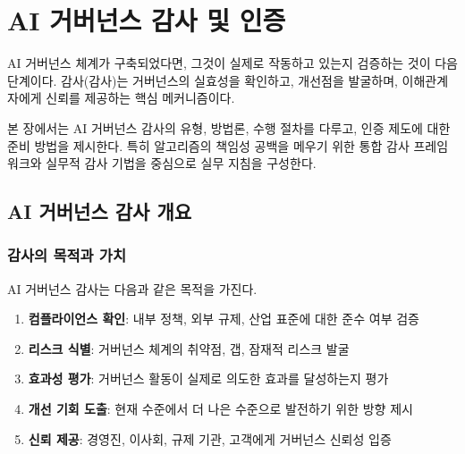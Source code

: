 
\chapter{AI 거버넌스 감사 및 인증}
\label{ch:audit_certification}

AI 거버넌스 체계가 구축되었다면, 
그것이 실제로 작동하고 있는지 검증하는 것이 다음 단계이다. 
감사(감사)는 거버넌스의 실효성을 확인하고, 
개선점을 발굴하며, 이해관계자에게 신뢰를 제공\cite{toreini2020relationship}하는 핵심 메커니즘이다.

본 장에서는 AI 거버넌스 감사의 유형, 방법론, 수행 절차를 다루고, 인증 제도에 대한 준비 방법\cite{zabala2024state}을 제시한다. 특히 알고리즘의 책임성 공백을 메우기 위한 통합 감사 프레임워크\cite{raji2020closing}와 실무적 감사 기법\cite{raji2019actionable}을 중심으로 실무 지침을 구성한다.


\section{AI 거버넌스 감사 개요}
\label{sec:11.1}

\subsection{감사의 목적과 가치}
\label{sec:11.1.1}

AI 거버넌스 감사는 다음과 같은 목적을 가진다.

\begin{enumerate}
 \item \textbf{컴플라이언스 확인\cite{mokander2022conformity}}: 
 내부 정책, 외부 규제, 산업 표준에 대한 준수 여부 검증
 
 \item \textbf{리스크 식별}:
 거버넌스 체계의 취약점, 갭, 잠재적 리스크 발굴
 
 \item \textbf{효과성 평가}: 
 거버넌스 활동이 실제로 의도한 효과를 달성하는지 평가
 
 \item \textbf{개선 기회 도출}: 
 현재 수준에서 더 나은 수준으로 발전하기 위한 방향 제시
 
 \item \textbf{신뢰 제공}: 
 경영진, 이사회, 규제 기관, 고객에게 거버넌스 신뢰성 입증
\end{enumerate}


